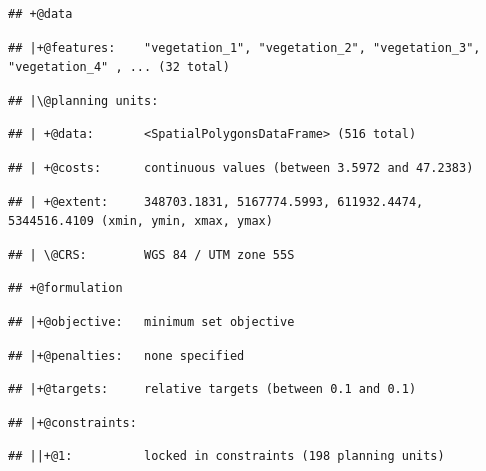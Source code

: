\documentclass[12pt,]{book}
\begin{document}
\begin{verbatim}
## +@data
\end{verbatim}

\begin{verbatim}
## |+@features:    "vegetation_1", "vegetation_2", "vegetation_3", "vegetation_4" , ... (32 total)
\end{verbatim}

\begin{verbatim}
## |\@planning units:
\end{verbatim}

\begin{verbatim}
## | +@data:       <SpatialPolygonsDataFrame> (516 total)
\end{verbatim}

\begin{verbatim}
## | +@costs:      continuous values (between 3.5972 and 47.2383)
\end{verbatim}

\begin{verbatim}
## | +@extent:     348703.1831, 5167774.5993, 611932.4474, 5344516.4109 (xmin, ymin, xmax, ymax)
\end{verbatim}

\begin{verbatim}
## | \@CRS:        WGS 84 / UTM zone 55S
\end{verbatim}

\begin{verbatim}
## +@formulation
\end{verbatim}

\begin{verbatim}
## |+@objective:   minimum set objective
\end{verbatim}

\begin{verbatim}
## |+@penalties:   none specified
\end{verbatim}

\begin{verbatim}
## |+@targets:     relative targets (between 0.1 and 0.1)
\end{verbatim}

\begin{verbatim}
## |+@constraints:
\end{verbatim}

\begin{verbatim}
## ||+@1:          locked in constraints (198 planning units)
\end{verbatim}
\end{document}
